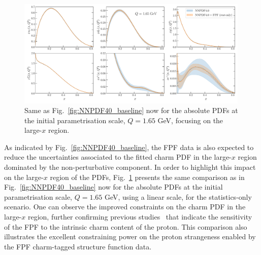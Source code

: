 \begin{figure}[t]
\centering
\includegraphics[width=0.99\textwidth]{plots/NNPDF40-FPFall-q1p65gev-abs.pdf}
\caption{
  Same as Fig.~\ref{fig:NNPDF40_baseline} now for the absolute PDFs
  at the initial parametrisation scale, $Q=1.65$ GeV, focusing
  on the large-$x$ region.
%
}
\label{fig:NNPDF40_lowQ_abs}
\end{figure}

As indicated by Fig.~\ref{fig:NNPDF40_baseline}, the FPF data is also expected
to reduce the uncertainties associated to the fitted charm PDF in the large-$x$ region 
dominated by the non-perturbative component.
%
In order to highlight this impact on the large-$x$ region of the PDFs,
Fig.~\ref{fig:NNPDF40_lowQ_abs} presents the same comparison as
in  Fig.~\ref{fig:NNPDF40_baseline} now for the absolute PDFs
at the initial parametrisation scale, $Q=1.65$ GeV, using a linear scale, for the statistics-only
scenario.
%
One can observe the improved constraints on the charm PDF in the large-$x$ region,
further confirming previous studies~\cite{Anchordoqui:2021ghd,Feng:2022inv} that indicate the
sensitivity of the FPF to the intrinsic charm content of the proton.
%
This comparison also illustrates the excellent constraining power on the proton
strangeness enabled by the FPF charm-tagged structure function data.


